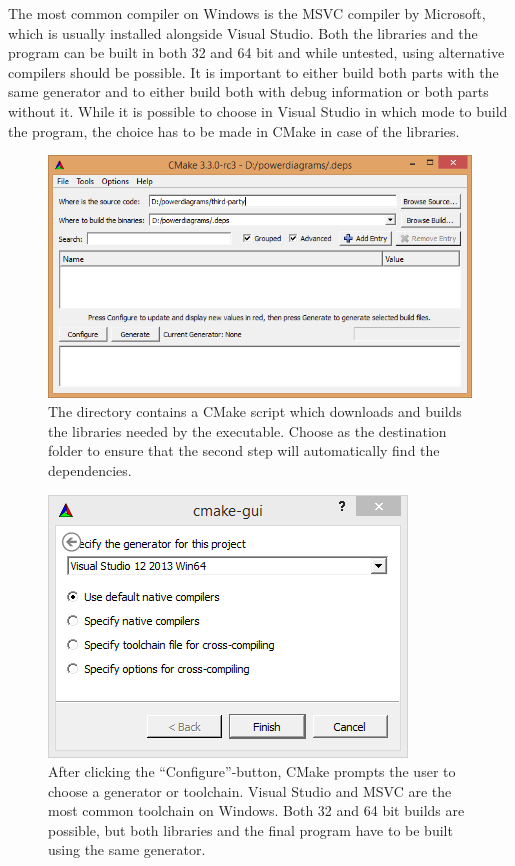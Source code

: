 The most common compiler on Windows is the MSVC compiler by Microsoft, which is usually installed alongside Visual Studio.
Both the libraries and the program can be built in both 32 and 64 bit and while untested, using alternative compilers should be possible.
It is important to either build both parts with the same generator and to either build both with debug information or both parts without it.
While it is possible to choose in Visual Studio in which mode to build the program, the choice has to be made in CMake in case of the libraries.
\begin{figure}[p]
    \centering
    \includegraphics[width=0.9\linewidth]{cmake_1.png}
    \caption{The  directory contains a CMake script which downloads and builds the libraries needed by the  executable.
    Choose  as the destination folder to ensure that the second step will automatically find the dependencies.}
    \label{fig:cmake_1}
\end{figure}
\begin{figure}[p]
    \centering
    \includegraphics[width=0.45\linewidth]{cmake_2.png}
    \caption{After clicking the \enquote{Configure}-button, CMake prompts the user to choose a generator or toolchain.
    Visual Studio and MSVC are the most common toolchain on Windows.
    Both 32 and 64 bit builds are possible, but both libraries and the final program have to be built using the same generator.}
    \label{fig:cmake_2}
\end{figure}
